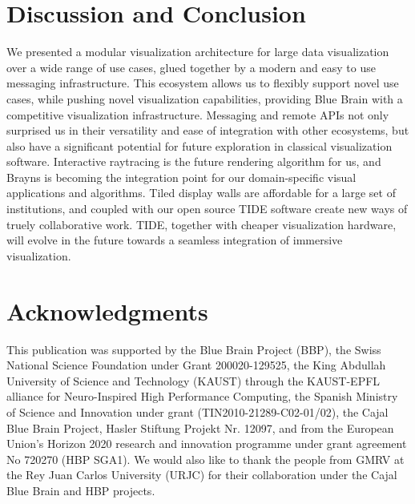 \documentclass[10pt]{llncs}
\begin{document}
\section{Discussion and Conclusion}
\label{sec:conclusions}

We presented a modular visualization architecture for large data visualization
over a wide range of use cases, glued together by a modern and easy to use
messaging infrastructure. This ecosystem allows us to flexibly support novel use
cases, while pushing novel visualization capabilities, providing Blue Brain with
a competitive visualization infrastructure. Messaging and remote APIs not only
surprised us in their versatility and ease of integration with other ecosystems,
but also have a significant potential for future exploration in classical
visualization software. Interactive raytracing is the future rendering algorithm
for us, and Brayns is becoming the integration point for our domain-specific
visual applications and algorithms. Tiled display walls are affordable for a
large set of institutions, and coupled with our open source TIDE software create
new ways of truely collaborative work. TIDE, together with cheaper visualization
hardware, will evolve in the future towards a seamless integration of immersive
visualization.


\section*{Acknowledgments}

This publication was supported by the Blue Brain Project (BBP), the Swiss
National Science Foundation under Grant 200020-129525, the King Abdullah
University of Science and Technology (KAUST) through the KAUST-EPFL alliance for
Neuro-Inspired High Performance Computing, the Spanish Ministry of Science and
Innovation under grant (TIN2010-21289-C02-01/02), the Cajal Blue Brain Project,
Hasler Stiftung Projekt Nr. 12097, and from the European Union’s Horizon 2020
research and innovation programme under grant agreement No 720270 (HBP SGA1). We
would also like to thank the people from GMRV at the Rey Juan Carlos University
(URJC) for their collaboration under the Cajal Blue Brain and HBP projects.




\end{document}
